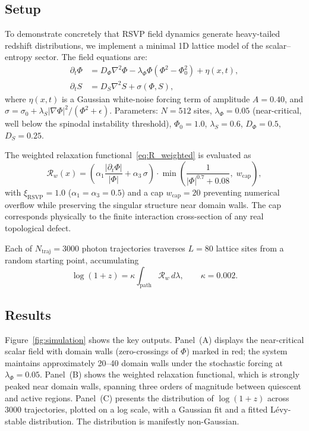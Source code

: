 \documentclass[12pt,a4paper]{article}
\theoremstyle{remark}
\begin{document}
\subsection{Setup}

To demonstrate concretely that RSVP field dynamics generate heavy-tailed
redshift distributions, we implement a minimal 1D lattice model of the
scalar--entropy sector. The field equations are:
\begin{align}
\partial_t \Phi &= D_\Phi \nabla^2\Phi - \lambda_\Phi\Phi(\Phi^2 - \Phi_0^2) + \eta(x,t), \\
\partial_t S    &= D_S\nabla^2 S + \sigma(\Phi, S),
\end{align}
where $\eta(x,t)$ is a Gaussian white-noise forcing term of amplitude
$A = 0.40$, and $\sigma = \sigma_0 + \lambda_S|\nabla\Phi|^2/(\Phi^2 + \epsilon)$.
Parameters: $N = 512$ sites, $\lambda_\Phi = 0.05$ (near-critical, well below
the spinodal instability threshold), $\Phi_0 = 1.0$, $\lambda_S = 0.6$,
$D_\Phi = 0.5$, $D_S = 0.25$.

The weighted relaxation functional~\eqref{eq:R_weighted} is evaluated as
\begin{equation}
\mathcal{R}_w(x) = \left(\alpha_1\frac{|\partial_t\Phi|}{|\Phi|}
+ \alpha_3\,\sigma\right) \cdot
\min\!\left(\frac{1}{|\Phi|^{0.7} + 0.08},\; w_{\mathrm{cap}}\right),
\end{equation}
with $\xi_{\mathrm{RSVP}} = 1.0$ ($\alpha_1 = \alpha_3 = 0.5$) and a cap
$w_{\mathrm{cap}} = 20$ preventing numerical overflow while preserving the
singular structure near domain walls. The cap corresponds physically to
the finite interaction cross-section of any real topological defect.

Each of $N_{\mathrm{traj}} = 3000$ photon trajectories traverses $L = 80$
lattice sites from a random starting point, accumulating
\begin{equation}
\log(1+z) = \kappa\int_{\mathrm{path}}\mathcal{R}_w\,d\lambda, \qquad \kappa = 0.002.
\end{equation}

\subsection{Results}

Figure~\ref{fig:simulation} shows the key outputs. Panel~(A) displays the
near-critical scalar field with domain walls (zero-crossings of $\Phi$) marked
in red; the system maintains approximately 20--40 domain walls under the
stochastic forcing at $\lambda_\Phi = 0.05$. Panel~(B) shows the weighted
relaxation functional, which is strongly peaked near domain walls, spanning
three orders of magnitude between quiescent and active regions. Panel~(C)
presents the distribution of $\log(1+z)$ across 3000 trajectories, plotted
on a log scale, with a Gaussian fit and a fitted Lévy-stable distribution.
The distribution is manifestly non-Gaussian.
\end{document}
